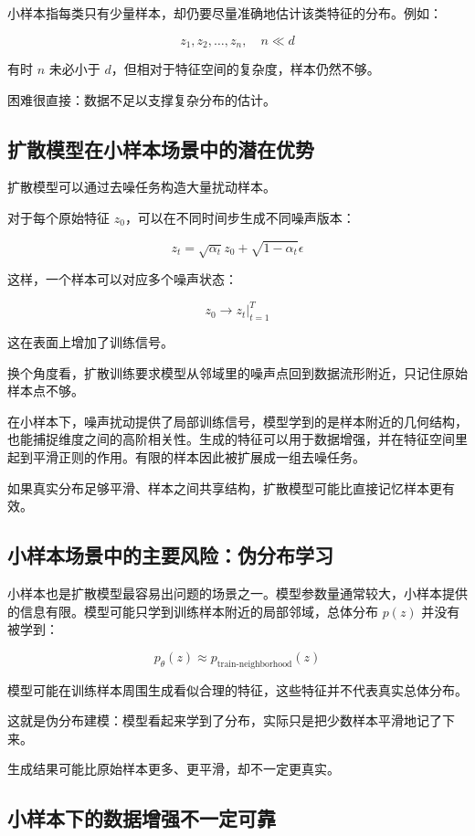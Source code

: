 小样本指每类只有少量样本，却仍要尽量准确地估计该类特征的分布。例如：

\[
{z_1,z_2,\dots,z_n}, \quad n \ll d
\]

有时 \(n\) 未必小于 \(d\)，但相对于特征空间的复杂度，样本仍然不够。

困难很直接：数据不足以支撑复杂分布的估计。

\subsection{扩散模型在小样本场景中的潜在优势}

扩散模型可以通过去噪任务构造大量扰动样本。

对于每个原始特征 \(z_0\)，可以在不同时间步生成不同噪声版本：

\[
z_t = \sqrt{\alpha_t}z_0 + \sqrt{1-\alpha_t}\epsilon
\]

这样，一个样本可以对应多个噪声状态：

\[
z_0 \rightarrow {z_t}\big |_{t=1}^{T}
\]

这在表面上增加了训练信号。

换个角度看，扩散训练要求模型从邻域里的噪声点回到数据流形附近，只记住原始样本点不够。

在小样本下，噪声扰动提供了局部训练信号，模型学到的是样本附近的几何结构，也能捕捉维度之间的高阶相关性。生成的特征可以用于数据增强，并在特征空间里起到平滑正则的作用。有限的样本因此被扩展成一组去噪任务。

如果真实分布足够平滑、样本之间共享结构，扩散模型可能比直接记忆样本更有效。

\subsection{小样本场景中的主要风险：伪分布学习}

小样本也是扩散模型最容易出问题的场景之一。模型参数量通常较大，小样本提供的信息有限。模型可能只学到训练样本附近的局部邻域，总体分布 \(p(z)\) 并没有被学到：

\[
p_\theta(z) \approx p_{\text{train-neighborhood}}(z)
\]

模型可能在训练样本周围生成看似合理的特征，这些特征并不代表真实总体分布。

这就是伪分布建模：模型看起来学到了分布，实际只是把少数样本平滑地记了下来。

生成结果可能比原始样本更多、更平滑，却不一定更真实。

\subsection{小样本下的数据增强不一定可靠}

